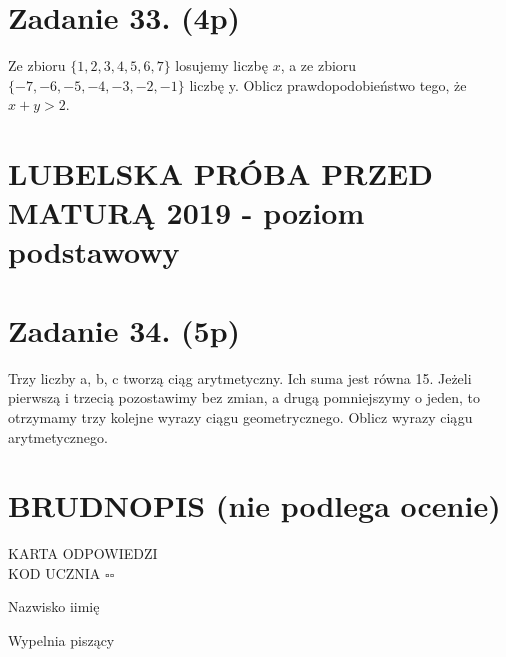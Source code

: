 \documentclass[10pt]{article}
\begin{document}
\section*{Zadanie 33. (4p)}
Ze zbioru \(\{1,2,3,4,5,6,7\}\) losujemy liczbę \(x\), a ze zbioru \(\{-7,-6,-5,-4,-3,-2,-1\}\) liczbę y. Oblicz prawdopodobieństwo tego, że \(x+y>2\).

\section*{LUBELSKA PRÓBA PRZED MATURĄ 2019 - poziom podstawowy}
\section*{Zadanie 34. (5p)}
Trzy liczby a, b, c tworzą ciąg arytmetyczny. Ich suma jest równa 15. Jeżeli pierwszą i trzecią pozostawimy bez zmian, a drugą pomniejszymy o jeden, to otrzymamy trzy kolejne wyrazy ciągu geometrycznego. Oblicz wyrazy ciągu arytmetycznego.

\section*{BRUDNOPIS (nie podlega ocenie)}
KARTA ODPOWIEDZI\\
KOD UCZNIA \(\square \square\)

Nazwisko iimię

Wypelnia piszący
\end{document}
